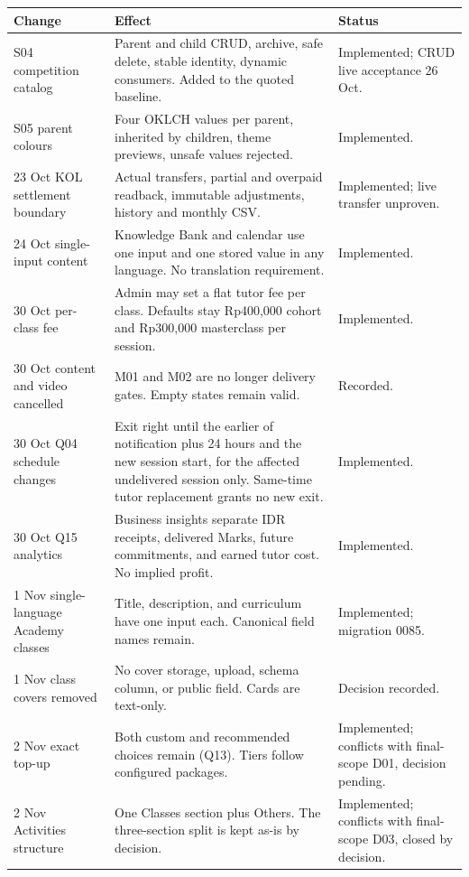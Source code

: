 \documentclass[11pt,a4paper]{article}
\begin{document}
\begin{longtable}{@{}L{3.0cm}L{8.1cm}L{4.0cm}@{}}
\toprule
\textbf{Change} & \textbf{Effect} & \textbf{Status} \\
\midrule
\endhead
S04 competition catalog & Parent and child CRUD, archive, safe delete, stable identity, dynamic consumers. Added to the quoted baseline. & Implemented; CRUD live acceptance 26 Oct. \\
S05 parent colours & Four OKLCH values per parent, inherited by children, theme previews, unsafe values rejected. & Implemented. \\
23 Oct KOL settlement boundary & Actual transfers, partial and overpaid readback, immutable adjustments, history and monthly CSV. & Implemented; live transfer unproven. \\
24 Oct single-input content & Knowledge Bank and calendar use one input and one stored value in any language. No translation requirement. & Implemented. \\
30 Oct per-class fee & Admin may set a flat tutor fee per class. Defaults stay Rp400,000 cohort and Rp300,000 masterclass per session. & Implemented. \\
30 Oct content and video cancelled & M01 and M02 are no longer delivery gates. Empty states remain valid. & Recorded. \\
30 Oct Q04 schedule changes & Exit right until the earlier of notification plus 24 hours and the new session start, for the affected undelivered session only. Same-time tutor replacement grants no new exit. & Implemented. \\
30 Oct Q15 analytics & Business insights separate IDR receipts, delivered Marks, future commitments, and earned tutor cost. No implied profit. & Implemented. \\
1 Nov single-language Academy classes & Title, description, and curriculum have one input each. Canonical field names remain. & Implemented; migration 0085. \\
1 Nov class covers removed & No cover storage, upload, schema column, or public field. Cards are text-only. & Decision recorded. \\
2 Nov exact top-up & Both custom and recommended choices remain (Q13). Tiers follow configured packages. & Implemented; conflicts with final-scope D01, decision pending. \\
2 Nov Activities structure & One Classes section plus Others. The three-section split is kept as-is by decision. & Implemented; conflicts with final-scope D03, closed by decision. \\

\end{longtable}
\end{document}
